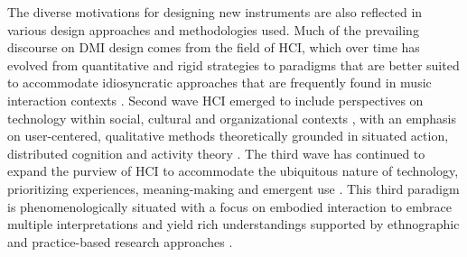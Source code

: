 \documentclass[letterpaper, 12pt]{article}
\begin{document}
The diverse motivations for designing new instruments are also reflected in various design approaches and methodologies used. Much of the prevailing discourse on DMI design comes from the field of HCI, which over time has evolved from quantitative and rigid strategies \citep{Bodker2015} to paradigms that are better suited to accommodate idiosyncratic approaches that are frequently found in music interaction contexts \citep{Wanderley2002}. Second wave HCI emerged to include perspectives on technology within social, cultural and organizational contexts \citep{kaptelinin2003}, with an emphasis on user-centered, qualitative methods theoretically grounded in situated action, distributed cognition and activity theory \citep{Bodker2006}. The third wave has continued to expand the purview of HCI to accommodate the ubiquitous nature of technology, prioritizing experiences, meaning-making and emergent use \citep{Bodker2015}. This third paradigm is phenomenologically situated with a focus on embodied interaction to embrace multiple interpretations and yield rich understandings \citep{Harrison2007} supported by ethnographic and practice-based research approaches \citep{Bodker2015}.


\end{document}
